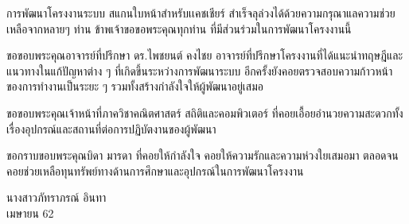 \begin{acknowledgements}
	การพัฒนาโครงงานระบบ สแกนใบหน้าสำหรับเเคชเชียร์ สำเร็จลุล่วงได้ด้วยความกรุณาแลความช่วยเหลือจากหลายๆ ท่าน ข้าพเจ้าขอขอพระคุณทุกท่าน ที่มีส่วนร่วมในการพัฒนาโครงงานนี้
	
    ขอขอบพระคุณอาจารย์ที่ปรึกษา  ดร.ไพชยนต์ คงไชย  อาจารย์ที่ปรึกษาโครงงานที่ได้แนะนำทฤษฎีและแนวทางในแก้ปัญหาต่าง ๆ  ที่เกิดขึ้นระหว่างการพัฒนาระบบ อีกครั้งยังคอยตรวจสอบความก้าวหน้าของการทำงานเป็นระยะ ๆ รวมทั้งสร้างกำลังใจให้ผู้พัฒนาอยู่เสมอ

  
    
   ขอขอบพระคุณเจ้าหน้าที่ภาควิชาคณิตศาสตร์ สถิติและคอมพิวเตอร์ ที่คอยเอื้อยอำนวยความสะดวกทั้งเรื่องอุปกรณ์และสถานที่ต่อการปฏิบัตงานของผู้พัฒนา
   
 
  ขอกราบขอบพระคุณบิดา มารดา ที่คอยให้กำลังใจ คอยให้ความรักและความห่วงใยเสมอมา
  ตลอดจนคอยช่วยเหลือทุนทรัพย์ทางด้านการศึกษาและอุปกรณ์ในการพัฒนาโครงงาน
    
\end{acknowledgements}

\begin{flushright}
    นางสาวภัทราภรณ์  อินทา
    \\
    เมษายน 62
\end{flushright}
